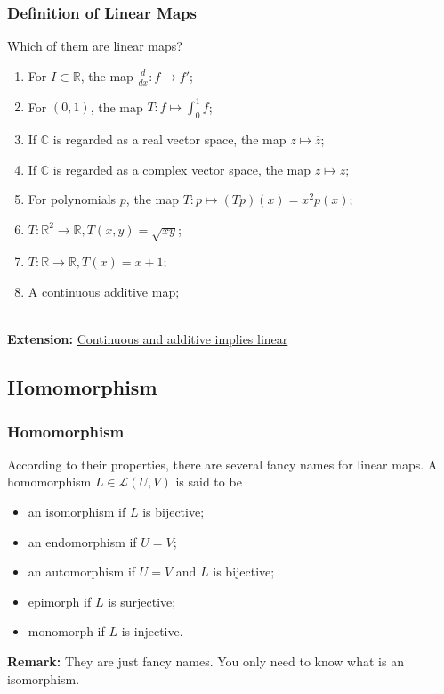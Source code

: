 \documentclass[12pt, t]{beamer}
\newcommand{\C}{\mathbb{C}} \newcommand{\F}{\mathbb{F}} \newcommand{\R}{\mathbb{R}} \newcommand{\Q}{\mathbb{Q}}
\newcommand{\nullspace}{~\\[15pt]}
\newcommand{\remark}{\textbf{Remark: }}
\begin{document}
\begin{frame}
    \frametitle{Definition of Linear Maps}

    Which of them are linear maps?
    \begin{enumerate}
        \item For $I\subset\R$, the map $\frac{d}{dx}:f\mapsto f'$;
        \item For $(0,1)$, the map $T:f\mapsto \int^{1}_0f$;
        \item If $\C$ is regarded as a real vector space, the map $z\mapsto\overline{z}$;
        \item If $\C$ is regarded as a complex vector space, the map $z\mapsto\overline{z}$;
        \item For polynomials $p$, the map $T:p\mapsto (Tp)(x)=x^2p(x)$;
        \item $T:\R^2\rightarrow\R, T(x,y)=\sqrt{xy}$;
        \item $T:\R\rightarrow\R, T(x)=x+1$;
        \item A continuous additive map;
    \end{enumerate}

    \pause

    \nullspace
    \textbf{Extension:}
    \href{https://math.stackexchange.com/questions/152632/continuous-and-additive-implies-linear}{Continuous and additive implies linear}
\end{frame}

\subsection{Homomorphism}
\begin{frame}
    \frametitle{Homomorphism}
    According to their properties, there are several fancy names for linear
    maps. A homomorphism $L\in\mathcal{L}(U,V)$ is said to be
    \begin{itemize}
        \item an isomorphism if $L$ is bijective;
        \item an endomorphism if $U=V$;
        \item an automorphism if $U=V$ and $L$ is bijective;
        \item epimorph if $L$ is surjective;
        \item monomorph if $L$ is injective.
    \end{itemize}

    \remark They are just fancy names. You only need to know what is an isomorphism.
\end{frame}
\end{document}
